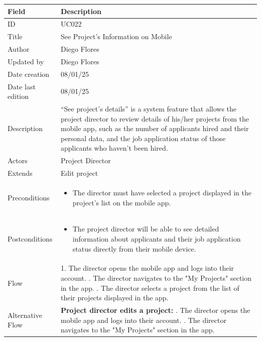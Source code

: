\documentclass{scrreprt}
\begin{document}
\begin{table}[H]
	\centering
	\begin{tabular}{|p{3cm}|p{10cm}|}
		\hline
		\textbf{Field} & \textbf{Description} \\ \hline
		ID & UC022 \\ \hline
		Title & See Project’s Information on Mobile \\ \hline
		Author & Diego Flores \\ \hline
		Updated by & Diego Flores \\ \hline
		Date creation & 08/01/25 \\ \hline
		Date last edition & 08/01/25 \\ \hline
		Description & 
		“See project’s details” is a system feature that allows the project director to review details of his/her projects from the mobile app, such as the number of applicants hired and their personal data, and the job application status of those applicants who haven’t been hired. \\ \hline
		Actors & Project Director \\ \hline
		Extends & Edit project \\ \hline
		Preconditions & 
		\begin{itemize}
			\item The director must have selected a project displayed in the project’s list on the mobile app.
		\end{itemize} \\ \hline
		Postconditions & 
		\begin{itemize}
			\item The project director will be able to see detailed information about applicants and their job application status directly from their mobile device.
		\end{itemize} \\ \hline
		Flow & 
		1. The director opens the mobile app and logs into their account. \newline
		2. The director navigates to the "My Projects" section in the app. \newline
		3. The director selects a project from the list of their projects displayed in the app. \\ \hline
		Alternative Flow & 
		\textbf{Project director edits a project:} \newline
		1. The director opens the mobile app and logs into their account. \newline
		2. The director navigates to the "My Projects" section in the app. \newline

\end{tabular}
\end{table}
\end{document}
